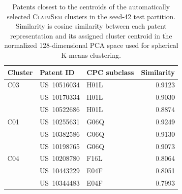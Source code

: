\begin{table}[t]
\centering
\small
\caption{Patents closest to the centroids of the automatically selected \textsc{ClaimSem} clusters in the seed-42 test partition. Similarity is cosine similarity between each patent representation and its assigned cluster centroid in the normalized 128-dimensional PCA space used for spherical K-means clustering.}
\label{tab:centroid_patents}
\setlength{\tabcolsep}{4pt}
\renewcommand{\arraystretch}{1.12}
\begin{tabular}{@{}lllr@{}}
\toprule
\textbf{Cluster} & \textbf{Patent ID} & \textbf{CPC subclass} & \textbf{Similarity} \\
\midrule
C03 & US~10516034 & H01L & 0.9123 \\
 & US~10170334 & H01L & 0.9030 \\
 & US~10522686 & H01L & 0.8874 \\
\addlinespace
C01 & US~10255631 & G06Q & 0.9249 \\
 & US~10382586 & G06Q & 0.9130 \\
 & US~10198765 & G06Q & 0.9073 \\
\addlinespace
C04 & US~10208780 & F16L & 0.8064 \\
 & US~10443229 & E04F & 0.8051 \\
 & US~10344483 & E04F & 0.7993 \\
\bottomrule
\end{tabular}
\end{table}
